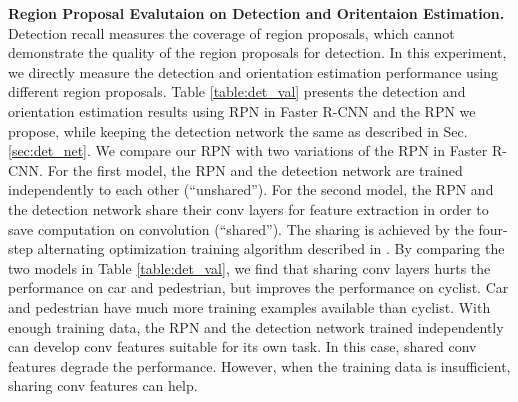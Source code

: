 \documentclass[10pt,twocolumn,letterpaper]{article}
\begin{document}
\noindent \textbf{Region Proposal Evalutaion on Detection and Oritentaion Estimation.} Detection recall measures the coverage of region proposals, which cannot demonstrate the quality of the region proposals for detection. In this experiment, we directly measure the detection and orientation estimation performance using different region proposals. Table \ref{table:det_val} presents the detection and orientation estimation results using RPN in Faster R-CNN \cite{ren2015faster} and the RPN we propose, while keeping the detection network the same as described in Sec. \ref{sec:det_net}. We compare our RPN with two variations of the RPN in Faster R-CNN. For the first model, the RPN and the detection network are trained independently to each other (``unshared''). For the second model, the RPN and the detection network share their conv layers for feature extraction in order to save computation on convolution (``shared''). The sharing is achieved by the four-step alternating optimization training algorithm described in \cite{ren2015faster}. By comparing the two models in Table \ref{table:det_val}, we find that sharing conv layers hurts the performance on car and pedestrian, but improves the performance on cyclist. Car and pedestrian have much more training examples available than cyclist. With enough training data, the RPN and the detection network trained independently can develop conv features suitable for its own task. In this case, shared conv features degrade the performance. However, when the training data is insufficient, sharing conv features can help.
\end{document}
